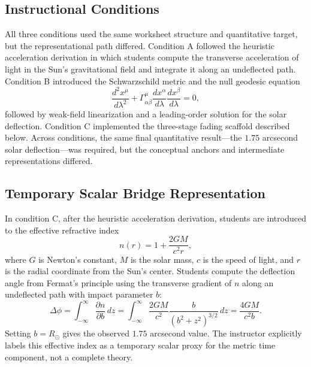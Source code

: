 \documentclass{article}
\begin{document}
\subsection{Instructional Conditions}
All three conditions used the same worksheet structure and quantitative target, but the representational path differed. Condition A followed the heuristic acceleration derivation in which students compute the transverse acceleration of light in the Sun's gravitational field and integrate it along an undeflected path. Condition B introduced the Schwarzschild metric and the null geodesic equation
\begin{equation}
\frac{d^{2}x^{\mu}}{d\lambda^{2}}
+
\Gamma^{\mu}_{\alpha\beta}
\frac{dx^{\alpha}}{d\lambda}
\frac{dx^{\beta}}{d\lambda}
=
0,
\end{equation}
followed by weak-field linearization and a leading-order solution for the solar deflection. Condition C implemented the three-stage fading scaffold described below. Across conditions, the same final quantitative result---the \(1.75\) arcsecond solar deflection---was required, but the conceptual anchors and intermediate representations differed.

\subsection{Temporary Scalar Bridge Representation}
In condition C, after the heuristic acceleration derivation, students are introduced to the effective refractive index
\begin{equation}
n(r)
=
1
+
\frac{2GM}{c^{2}r},
\end{equation}
where \(G\) is Newton's constant, \(M\) is the solar mass, \(c\) is the speed of light, and \(r\) is the radial coordinate from the Sun's center. Students compute the deflection angle from Fermat's principle using the transverse gradient of \(n\) along an undeflected path with impact parameter \(b\):
\begin{equation}
\Delta \phi
=
\int_{-\infty}^{\infty}
\frac{\partial n}{\partial b}
\,dz
=
\int_{-\infty}^{\infty}
\frac{2GM}{c^{2}}
\frac{b}{(b^{2}+z^{2})^{3/2}}
\,dz
=
\frac{4GM}{c^{2}b}.
\end{equation}
Setting \(b=R_{\odot}\) gives the observed \(1.75\) arcsecond value. The instructor explicitly labels this effective index as a temporary scalar proxy for the metric time component, not a complete theory.
\end{document}
